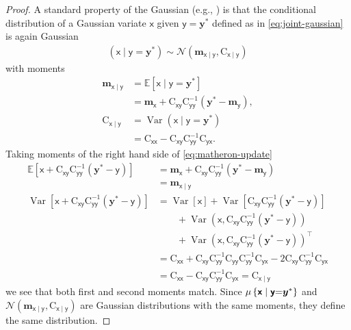 \documentclass[runningheads]{llncs}
\newcommand{\Ex}{\mathbb{E}}
\newcommand{\var}{\operatorname{Var}}
\newcommand{\vv}[1]{\boldsymbol{#1}}
\newcommand{\mm}[1]{\mathrm{#1}}
\newcommand{\rv}[1]{\mathsf{#1}}
\newcommand{\vrv}[1]{\vv{\rv{#1}}}
\newcommand{\Normal}{\mathcal{N}}
\newcommand{\gvn}{\mid}
\begin{document}
\begin{proof}
    A standard property of the Gaussian (e.g., \cite{Petersen2012Matrix}) is that the conditional distribution of a Gaussian variate  $\vrv{x}$ given $\vrv{y} = \vv{y}^*$ defined as in \eqref{eq:joint-gaussian} is again Gaussian
    \begin{align}
        \left(\vrv{x} \gvn \vrv{y} {=} \vv{y}^*\right)
        \sim\Normal(\vv{m}_{\vrv{x}\gvn\vrv{y}}, \mm{C}_{\vrv{x}\gvn\vrv{y}})\label{eq:conditional-gaussian}
    \end{align}
    with moments
    \begin{align}
        \vv{m}_{\vrv{x}\gvn\vrv{y}}
            &=\Ex [\vrv{x} \gvn \vrv{y} {=} \vv{y}^*] \\
            &= \vv{m}_{\vrv{x}} + \mm{C}_{\vrv{xy}} \mm{C}_{\vrv{yy}}^{-1} \left( \vv{y}^* - \vv{m}_{\vrv{y}} \right), \label{eq:conditional-mean}\\
        \mm{C}_{\vrv{x}\gvn\vrv{y}}
            &= \var \left(\vrv{x} \gvn \vrv{y} {=} \vv{y}^*\right) \\
            &= \mm{C}_{\vrv{xx}} - \mm{C}_{\vrv{xy}} \mm{C}_{\vrv{yy}}^{-1} \mm{C}_{\vrv{yx}}. \label{eq:conditional-cov}
    \end{align}
Taking moments of the right hand side of \eqref{eq:matheron-update}
\begin{align}
\Ex\left[\vrv{x}+\mm{C}_{\vrv{xy}} \mm{C}_{\vrv{yy}}^{-1}(\vv{y}^*-\vrv{y})\right]
&=\vv{m}_{\vrv{x}} +\mm{C}_{\vrv{xy}}\mm{C}_{\vrv{yy}}^{-1}(\vv{y}^*-\vv{m}_{\vrv{y}})\\
&=\vv{m}_{\vrv{x}\gvn\vrv{y}}\\
\var\left[\vrv{x}+\mm{C}_{\vrv{xy}} \mm{C}_{\vrv{yy}}^{-1}(\vv{y}^*-\vrv{y})\right]
&=
    \var[\vrv{x}]+\var[\mm{C}_{\vrv{xy}} \mm{C}_{\vrv{yy}}^{-1}(\vv{y}^*-\vrv{y})] \nonumber \\
    &\hspace{2em} +\var(\vrv{x},\mm{C}_{\vrv{xy}} \mm{C}_{\vrv{yy}}^{-1}(\vv{y}^*-\vrv{y}))\nonumber \\
    &\hspace{2em} +\var(\vrv{x},\mm{C}_{\vrv{xy}} \mm{C}_{\vrv{yy}}^{-1}(\vv{y}^*-\vrv{y}))^{\top}\\
&=\mm{C}_{\vrv{x}\vrv{x}} +\mm{C}_{\vrv{xy}} \mm{C}_{\vrv{yy}}^{-1}\mm{C}_{\vrv{yy}} \mm{C}_{\vrv{yy}}^{-1}\mm{C}_{\vrv{yx}}
-  2\mm{C}_{\vrv{xy}} \mm{C}_{\vrv{yy}}^{-1}\mm{C}_{\vrv{yx}}\\
&=\mm{C}_{\vrv{x}\vrv{x}} -\mm{C}_{\vrv{xy}} \mm{C}_{\vrv{yy}}^{-1}\mm{C}_{\vrv{yx}} =\mm{C}_{\vrv{x}\gvn\vrv{y}}
\end{align}
we see that both first and second moments match.
Since $\Law\left\{\vrv{x} \gvn \vrv{y} {=} \vv{y}^*\right\}$ and
$\Normal(\vv{m}_{\vrv{x}\gvn\vrv{y}}, \mm{C}_{\vrv{x}\gvn\vrv{y}})$ are Gaussian distributions with the same moments, they define the same distribution.
\end{proof}
\end{document}
